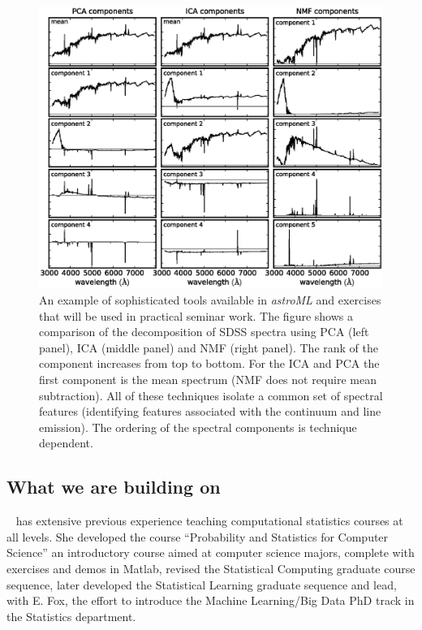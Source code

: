 \begin{figure}[!t]
\vskip -1.8in
\includegraphics[width=1.02\hsize,clip]{astroML2.eps}
\vskip -2.0in
\caption{An example of sophisticated tools available in {\it astroML} and exercises that will be
used in practical seminar work. The figure shows a comparison of the decomposition of SDSS 
spectra using PCA (left panel), ICA (middle panel) and NMF (right panel). The rank of the component
increases from top to bottom. For the ICA and PCA the first component is the mean spectrum (NMF 
does not require mean subtraction). All of these techniques isolate a common set of spectral features 
(identifying features associated with the continuum and line emission). The ordering of the spectral 
components is technique dependent.} 
\label{Fig:astroML2}
\end{figure}

\subsection{What we are building on}
\label{sec:precursors}

\meila~ has extensive previous experience teaching computational
statistics courses at all levels. She developed the
course ``Probability and Statistics for Computer Science'' an
introductory course aimed at computer science majors, complete with exercises and demos in Matlab, revised the Statistical Computing graduate course sequence, later developed the Statistical Learning graduate sequence and lead, with E. Fox, the effort to introduce the Machine Learning/Big Data PhD track in the Statistics department. 


